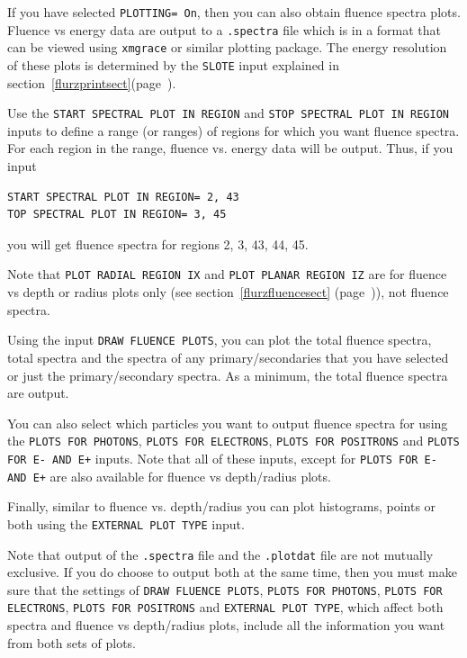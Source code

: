 \documentclass[12pt,twoside]{article}  %
\newcommand{\lpage}[1]{(page~\pageref{#1})}
\begin{document}
If you have selected {\tt PLOTTING= On}, then you can also obtain
fluence spectra plots.  Fluence vs energy data are output to a {\tt .spectra}
file which is in a format that can be viewed using {\tt xmgrace} or
similar plotting package.  The energy resolution of these plots is
determined by the {\tt SLOTE} input explained in 
section~\ref{flurzprintsect}\lpage{flurzprintsect}.

Use the {\tt START SPECTRAL PLOT IN REGION} and 
{\tt STOP SPECTRAL PLOT IN REGION} inputs to define a range (or ranges) of 
regions
for which you want fluence spectra.  For each region in the range, fluence
vs. energy data will be output.  Thus, if you input 
\begin{verbatim}
START SPECTRAL PLOT IN REGION= 2, 43
TOP SPECTRAL PLOT IN REGION= 3, 45
\end{verbatim}
you will get fluence spectra for regions 2, 3, 43, 44, 45.  

Note that {\tt PLOT RADIAL REGION IX} and {\tt PLOT PLANAR REGION IZ}
are for fluence vs depth or radius plots only (see
section~\ref{flurzfluencesect} \lpage{flurzfluencesect}), not fluence
spectra.

Using the input
{\tt DRAW FLUENCE PLOTS}, you can plot the total fluence spectra,
total spectra and the spectra of any primary/secondaries that you
have selected or just the primary/secondary
spectra.  As a minimum, the total fluence spectra are output.

You can also select which particles you want to output fluence spectra
for using the {\tt PLOTS FOR PHOTONS}, {\tt PLOTS FOR ELECTRONS},
{\tt PLOTS FOR POSITRONS} and {\tt PLOTS FOR E- AND E+} inputs.
Note that all of these inputs, except for {\tt PLOTS FOR E- AND E+} are
also available for fluence vs depth/radius plots. 

Finally, similar to fluence vs. depth/radius you can plot histograms,
points or both using the {\tt EXTERNAL PLOT TYPE} input.

Note that output of the {\tt .spectra} file and the {\tt .plotdat} file
are not mutually exclusive.  If you do choose to output both at the same
time, then you must make sure that the settings of
{\tt DRAW FLUENCE PLOTS}, {\tt PLOTS FOR PHOTONS}, {\tt PLOTS FOR ELECTRONS}, {\tt PLOTS FOR POSITRONS} and {\tt EXTERNAL PLOT TYPE}, which
affect both spectra and fluence vs depth/radius plots, include all the
information you want from both sets of plots. 

\end{document}
